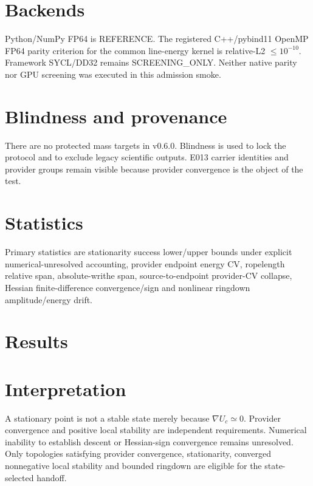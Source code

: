 \documentclass[11pt]{article}
\begin{document}
\section{Backends}
Python/NumPy FP64 is REFERENCE. The registered C++/pybind11 OpenMP FP64 parity criterion for the common line-energy kernel is relative-L2 $\le10^{-10}$. Framework SYCL/DD32 remains SCREENING\_ONLY. Neither native parity nor GPU screening was executed in this admission smoke.
\section{Blindness and provenance}
There are no protected mass targets in v0.6.0. Blindness is used to lock the protocol and to exclude legacy scientific outputs. E013 carrier identities and provider groups remain visible because provider convergence is the object of the test.
\section{Statistics}
Primary statistics are stationarity success lower/upper bounds under explicit numerical-unresolved accounting, provider endpoint energy CV, ropelength relative span, absolute-writhe span, source-to-endpoint provider-CV collapse, Hessian finite-difference convergence/sign and nonlinear ringdown amplitude/energy drift.
\section{Results}


\section{Interpretation}
A stationary point is not a stable state merely because $\nabla U_c\simeq0$. Provider convergence and positive local stability are independent requirements. Numerical inability to establish descent or Hessian-sign convergence remains unresolved. Only topologies satisfying provider convergence, stationarity, converged nonnegative local stability and bounded ringdown are eligible for the state-selected handoff.
\end{document}
